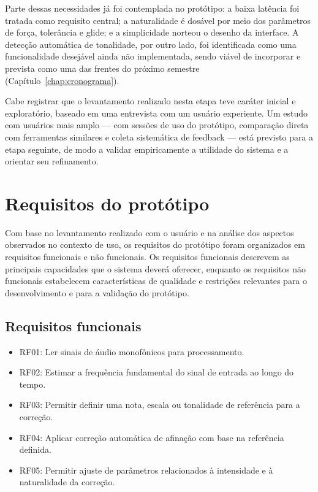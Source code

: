 Parte dessas necessidades já foi contemplada no protótipo: a baixa latência foi
tratada como requisito central; a naturalidade é dosável por meio dos parâmetros de
força, tolerância e glide; e a simplicidade norteou o desenho da interface. A
detecção automática de tonalidade, por outro lado, foi identificada como uma
funcionalidade desejável ainda não implementada, sendo viável de incorporar e
prevista como uma das frentes do próximo semestre (Capítulo~\ref{chap:cronograma}).

Cabe registrar que o levantamento realizado nesta etapa teve caráter inicial e
exploratório, baseado em uma entrevista com um usuário experiente. Um estudo com
usuários mais amplo --- com sessões de uso do protótipo, comparação direta com
ferramentas similares e coleta sistemática de feedback --- está previsto para a
etapa seguinte, de modo a validar empiricamente a utilidade do sistema e a orientar
seu refinamento.

\section{Requisitos do protótipo}

Com base no levantamento realizado com o usuário e na análise dos aspectos observados no contexto de uso, os requisitos do protótipo foram organizados em requisitos funcionais e não funcionais. Os requisitos funcionais descrevem as principais capacidades que o sistema deverá oferecer, enquanto os requisitos não funcionais estabelecem características de qualidade e restrições relevantes para o desenvolvimento e para a validação do protótipo.

\subsection{Requisitos funcionais}

\begin{itemize}
    \item RF01: Ler sinais de áudio monofônicos para processamento.
    \item RF02: Estimar a frequência fundamental do sinal de entrada ao longo do tempo.
    \item RF03: Permitir definir uma nota, escala ou tonalidade de referência para a correção.
    \item RF04: Aplicar correção automática de afinação com base na referência definida.
    \item RF05: Permitir ajuste de parâmetros relacionados à intensidade e à naturalidade da correção.
\end{itemize}


